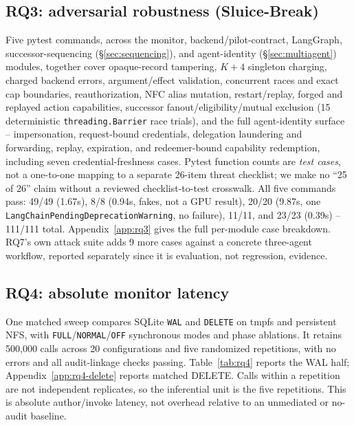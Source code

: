 \documentclass[conference,compsoc]{IEEEtran}
\begin{document}
\subsection{RQ3: adversarial robustness (Sluice-Break)}
Five pytest commands, across the monitor, backend/pilot-contract,
LangGraph, successor-sequencing (\S\ref{sec:sequencing}), and
agent-identity (\S\ref{sec:multiagent}) modules, together cover
opaque-record tampering, $K+4$ singleton charging, charged backend
errors, argument/effect validation, concurrent races and exact cap
boundaries, reauthorization, NFC alias mutation, restart/replay, forged
and replayed action capabilities, successor fanout/eligibility/mutual
exclusion (15 deterministic \texttt{threading.Barrier} race trials), and
the full agent-identity surface -- impersonation, request-bound
credentials, delegation laundering and forwarding, replay, expiration,
and redeemer-bound capability redemption, including seven
credential-freshness cases. Pytest function counts are \emph{test
cases}, not a one-to-one mapping to a separate 26-item threat checklist;
we make no ``25 of 26'' claim without a reviewed checklist-to-test
crosswalk. All five commands pass: 49/49 (1.67s), 8/8 (0.94s, fakes, not
a GPU result), 20/20 (9.87s, one
\texttt{LangChainPendingDeprecationWarning}, no failure), 11/11, and
23/23 (0.39s) -- 111/111 total. Appendix~\ref{app:rq3} gives the full
per-module case breakdown. RQ7's own attack suite adds 9 more cases
against a concrete three-agent workflow, reported separately since it is
evaluation, not regression, evidence.

\subsection{RQ4: absolute monitor latency}
One matched sweep compares SQLite \texttt{WAL} and \texttt{DELETE} on tmpfs
and persistent NFS, with \texttt{FULL}/\texttt{NORMAL}/\texttt{OFF}
synchronous modes and phase ablations. It retains 500{,}000 calls across 20
configurations and five randomized repetitions, with no
errors and all audit-linkage checks passing. Table~\ref{tab:rq4} reports the
WAL half; Appendix~\ref{app:rq4-delete} reports matched DELETE. Calls within a
repetition are not independent replicates, so the inferential unit is the five
repetitions. This is absolute author/invoke latency, not overhead relative to
an unmediated or no-audit baseline.
\end{document}
